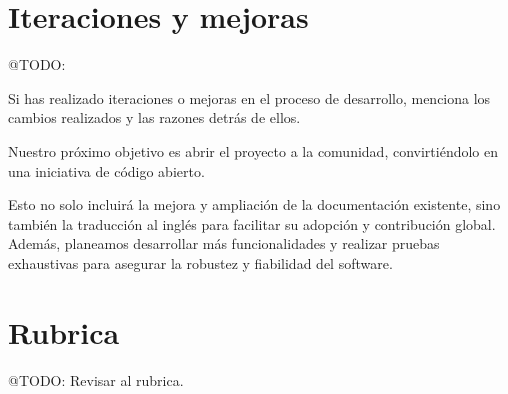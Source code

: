 \section{Iteraciones y mejoras}
\colorbox{color_highlight}{@TODO:}

Si has realizado iteraciones o mejoras en el proceso de desarrollo, menciona los cambios realizados y las razones detrás
de ellos.

Nuestro próximo objetivo es abrir el proyecto a la comunidad, convirtiéndolo en una iniciativa de código abierto.

Esto no solo incluirá la mejora y ampliación de la documentación existente, sino también la traducción al inglés para
facilitar su adopción y contribución global.
Además, planeamos desarrollar más funcionalidades y realizar pruebas exhaustivas para asegurar la robustez y fiabilidad
del software.


\section{Rubrica}
\colorbox{color_highlight}{@TODO:}
Revisar al rubrica.


